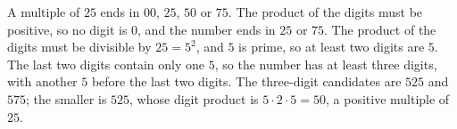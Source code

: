 A multiple of $25$ ends in $00$, $25$, $50$ or $75$. The product of the digits must be positive, so no digit is $0$, and the number ends in $25$ or $75$. The product of the digits must be divisible by $25=5^2$, and $5$ is prime, so at least two digits are $5$. The last two digits contain only one $5$, so the number has at least three digits, with another $5$ before the last two digits. The three-digit candidates are $525$ and $575$; the smaller is $\boxed{525}$, whose digit product is $5\cdot2\cdot5=50$, a positive multiple of $25$.

